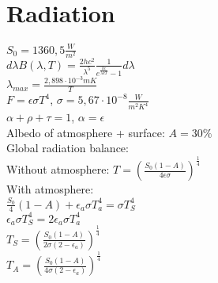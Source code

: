 \section*{Radiation}
$S_0=1360,5\frac{W}{m^2}$\\
$d\lambda B(\lambda,T)=\frac{2hc^2}{\lambda^5}\frac{1}{e^{\frac{hc}{\lambda k T}}-1}d\lambda$\\
$\lambda_{max}=\frac{2,898\cdot10^{-3}mK}{T}$\\
$F=\epsilon\sigma T^4$, $\sigma=5,67\cdot10^{-8}\frac{W}{m^2K^4}$\\
$\alpha + \rho + \tau = 1$, $\alpha = \epsilon$\\
Albedo of atmosphere + surface: $A = 30\%$\\
Global radiation balance:\\ 
Without atmosphere: $T = \left(\frac{S_0(1-A)}{4\epsilon\sigma}\right)^{\frac{1}{4}}$\\
With atmosphere:\\
$\frac{S_0}{4}(1-A)+\epsilon_a\sigma T_a^4=\sigma T_S^4$\\
$\epsilon_a\sigma T_S^4=2\epsilon_a\sigma T_a^4$\\
$T_S = \left(\frac{S_0(1-A)}{2\sigma(2-\epsilon_a)}\right)^{\frac{1}{4}}$\\
$T_A = \left(\frac{S_0(1-A)}{4\sigma(2-\epsilon_a)}\right)^{\frac{1}{4}}$
